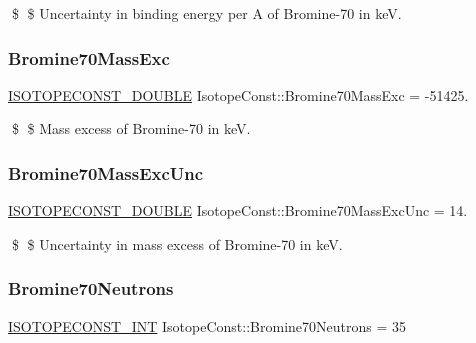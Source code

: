 \$ \$ Uncertainty in binding energy per A of Bromine-\/70 in keV. \mbox{\label{group___isotope_const-_bromine-_br70_ga1c4c7eded9c2084bed5a6024b970956e}} 
\subsubsection{\texorpdfstring{Bromine70\+Mass\+Exc}{Bromine70MassExc}}
{\footnotesize\ttfamily \mbox{\hyperlink{group___isotope_const-_macros_ga8f45a7272ce02c0b4c65c44636ed719a}{I\+S\+O\+T\+O\+P\+E\+C\+O\+N\+S\+T\+\_\+\+D\+O\+U\+B\+LE}} Isotope\+Const\+::\+Bromine70\+Mass\+Exc = -\/51425.}

\$ \$ Mass excess of Bromine-\/70 in keV. \mbox{\label{group___isotope_const-_bromine-_br70_ga7a0c5236bed5d97bda08596f38baea44}} 
\subsubsection{\texorpdfstring{Bromine70\+Mass\+Exc\+Unc}{Bromine70MassExcUnc}}
{\footnotesize\ttfamily \mbox{\hyperlink{group___isotope_const-_macros_ga8f45a7272ce02c0b4c65c44636ed719a}{I\+S\+O\+T\+O\+P\+E\+C\+O\+N\+S\+T\+\_\+\+D\+O\+U\+B\+LE}} Isotope\+Const\+::\+Bromine70\+Mass\+Exc\+Unc = 14.}

\$ \$ Uncertainty in mass excess of Bromine-\/70 in keV. \mbox{\label{group___isotope_const-_bromine-_br70_gab2cf62eee85bd1b6fb8db0169a05d1ac}} 
\subsubsection{\texorpdfstring{Bromine70\+Neutrons}{Bromine70Neutrons}}
{\footnotesize\ttfamily \mbox{\hyperlink{group___isotope_const-_macros_ga5f18360b3e99483a35c32d789e62621c}{I\+S\+O\+T\+O\+P\+E\+C\+O\+N\+S\+T\+\_\+\+I\+NT}} Isotope\+Const\+::\+Bromine70\+Neutrons = 35}

